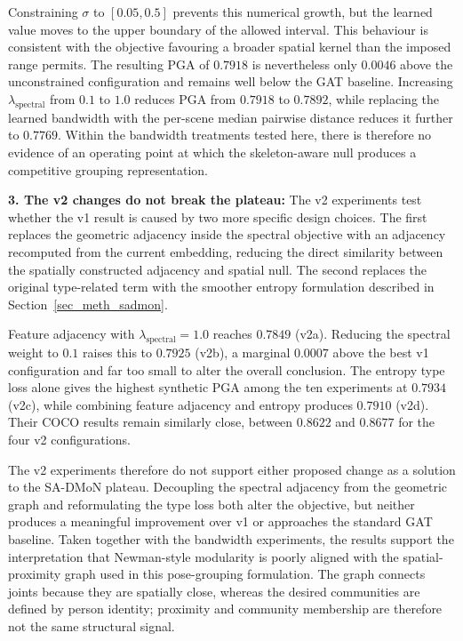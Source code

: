Constraining $\sigma$ to $[0.05,0.5]$ prevents this numerical growth,
but the learned value moves to the upper boundary of the allowed
interval. This behaviour is consistent with the objective favouring a
broader spatial kernel than the imposed range permits. The resulting
PGA of $0.7918$ is nevertheless only $0.0046$ above the unconstrained
configuration and remains well below the GAT baseline. Increasing
$\lambda_{\text{spectral}}$ from $0.1$ to $1.0$ reduces PGA from
$0.7918$ to $0.7892$, while replacing the learned bandwidth with the
per-scene median pairwise distance reduces it further to $0.7769$.
Within the bandwidth treatments tested here, there is therefore no
evidence of an operating point at which the skeleton-aware null
produces a competitive grouping representation.

\textbf{3. The v2 changes do not break the plateau:}
The v2 experiments test whether the v1 result is caused by two more
specific design choices. The first replaces the geometric adjacency
inside the spectral objective with an adjacency recomputed from the
current embedding, reducing the direct similarity between the
spatially constructed adjacency and spatial null. The second replaces
the original type-related term with the smoother entropy formulation
described in Section~\ref{sec_meth_sadmon}.

Feature adjacency with
$\lambda_{\text{spectral}}=1.0$ reaches $0.7849$ (v2a). Reducing the
spectral weight to $0.1$ raises this to $0.7925$ (v2b), a marginal
$0.0007$ above the best v1 configuration and far too small to alter the
overall conclusion. The entropy type loss alone gives the highest
synthetic PGA among the ten experiments at $0.7934$ (v2c), while
combining feature adjacency and entropy produces $0.7910$ (v2d).
Their COCO results remain similarly close, between $0.8622$ and
$0.8677$ for the four v2 configurations.

The v2 experiments therefore do not support either proposed change as
a solution to the SA-DMoN plateau. Decoupling the spectral adjacency
from the geometric graph and reformulating the type loss both alter the
objective, but neither produces a meaningful improvement over v1 or
approaches the standard GAT baseline. Taken together with the bandwidth
experiments, the results support the interpretation that Newman-style
modularity is poorly aligned with the spatial-proximity graph used in
this pose-grouping formulation. The graph connects joints because they
are spatially close, whereas the desired communities are defined by
person identity; proximity and community membership are therefore not
the same structural signal.

